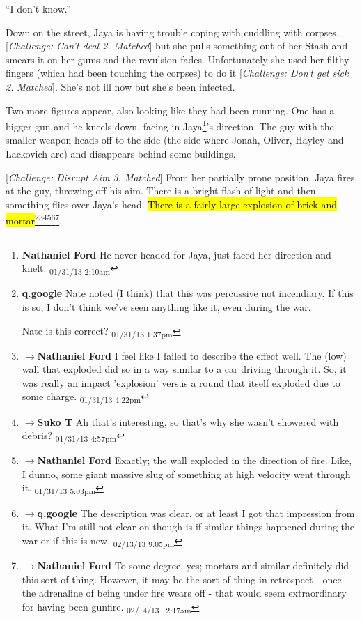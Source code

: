 ``I don't know.''



Down on the street, Jaya is having trouble coping with cuddling with corpses. {[}\textit{Challenge: Can't deal 2.  Matched}{]} but she pulls something out of her Stash and smears it on her gums and the revulsion fades.  Unfortunately she used her filthy fingers (which had been touching the corpses) to do it {[}\textit{Challenge: Don't get sick 2. }\textit{Matched}{]}.  She's not ill now but she's been infected.



Two more figures appear, also looking like they had been running.  One has a bigger gun and he kneels down, facing in Jaya\footnote{\textbf{Nathaniel Ford }He never headed for Jaya, just faced her direction and knelt. \textsubscript{01/31/13 2:10am}}'s direction.  The guy with the smaller weapon heads off to the side (the side where Jonah, Oliver, Hayley and Lackovich are) and disappears behind some buildings.



{[}\textit{Challenge: Disrupt Aim 3. Matched}{]} From her partially prone position, Jaya fires at the guy, throwing off his aim.  There is a bright flash of light and then something flies over Jaya's head. \hl{There is a fairly large explosion of brick and mortar}\footnote{\textbf{q.google }Nate noted (I think) that this was percussive not incendiary.  If this is so, I don't think we've seen anything like it, even during the war.

Nate is this correct? \textsubscript{01/31/13 1:37pm}}\footnote{$\rightarrow$\textbf{Nathaniel Ford }I feel like I failed to describe the effect well. The (low) wall that exploded did so in a way similar to a car driving through it. So, it was really an impact 'explosion' versus a round that itself exploded due to some charge. \textsubscript{01/31/13 4:22pm}}\footnote{$\rightarrow$\textbf{Suko T }Ah that's interesting, so that's why she wasn't showered with debris? \textsubscript{01/31/13 4:57pm}}\footnote{$\rightarrow$\textbf{Nathaniel Ford }Exactly; the wall exploded in the direction of fire. Like, I dunno, some giant massive slug of something at high velocity went through it. \textsubscript{01/31/13 5:03pm}}\footnote{$\rightarrow$\textbf{q.google }The description was clear, or at least I got that impression from it.  What I'm still not clear on though is if similar things happened during the war or if this is new. \textsubscript{02/13/13 9:05pm}}\footnote{$\rightarrow$\textbf{Nathaniel Ford }To some degree, yes; mortars and similar definitely did this sort of thing. However, it may be the sort of thing in retrospect - once the adrenaline of being under fire wears off - that would seem extraordinary for having been gunfire. \textsubscript{02/14/13 12:17am}}. 



